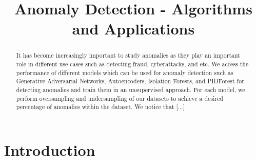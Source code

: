 \documentclass[letterpaper]{article}
\title{Anomaly Detection - Algorithms and Applications}
\author{} %
\begin{document}
\maketitle

\begin{abstract}
It has become increasingly important to study anomalies as they play an important role in different use cases such as detecting fraud, cyberattacks, and etc.
We access the performance of different models which can be used for anomaly detection such as Generative Adversarial Networks, Autoencoders, 
Isolation Forests, and PIDForest for detecting anomalies and train them in an unsupervised approach.
For each model, we perform oversampling and undersampling of our datasets to achieve a desired percentage of anomalies within the dataset.
We notice that [...]
\end{abstract}

\section{Introduction}
\end{document}

